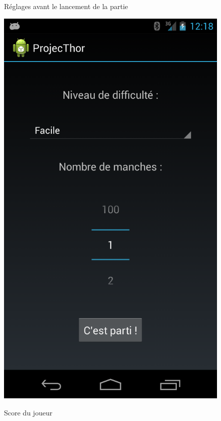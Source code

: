 \begin{figure}
	\begin{minipage}{0.45\textwidth}
		\caption{Réglages avant le lancement de la partie}
		\label{view_2}
		\center
		\includegraphics[scale=0.2]{view_2.png}
	\end{minipage}
	\hspace{0.1\textwidth}
	\begin{minipage}{0.45\textwidth}
		\caption{Score du joueur}
		\label{view_3}
		\center

\end{minipage}
\end{figure}
